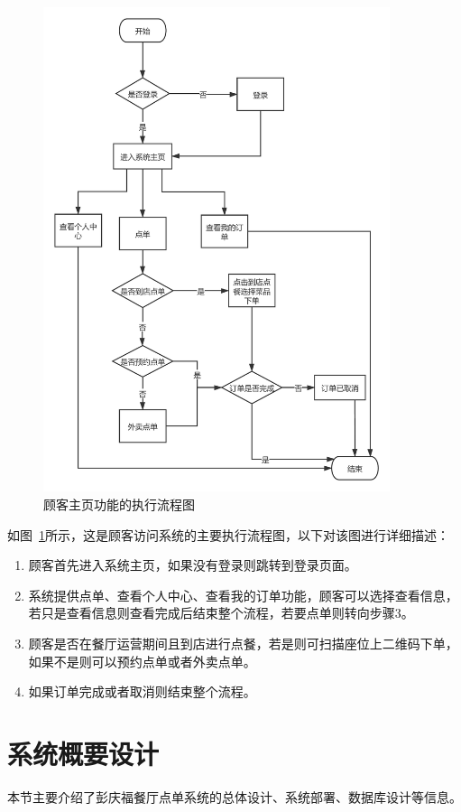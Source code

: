 \begin{figure}[htbp!]
  \centering
  \includegraphics[width=4in]{FIGs/chapter3/flow.pdf}
  \caption{顾客主页功能的执行流程图}\label{fig_flowCH3}
\end{figure}

如图~\ref{fig_flowCH3}所示，这是顾客访问系统的主要执行流程图，以下对该图进行详细描述：
\begin{enumerate}
  \item 顾客首先进入系统主页，如果没有登录则跳转到登录页面。
  \item 系统提供点单、查看个人中心、查看我的订单功能，顾客可以选择查看信息，若只是查看信息则查看完成后结束整个流程，若要点单则转向步骤3。
  \item 顾客是否在餐厅运营期间且到店进行点餐，若是则可扫描座位上二维码下单，如果不是则可以预约点单或者外卖点单。
  \item 如果订单完成或者取消则结束整个流程。
\end{enumerate}

\section{系统概要设计}
本节主要介绍了彭庆福餐厅点单系统的总体设计、系统部署、数据库设计等信息。\\
